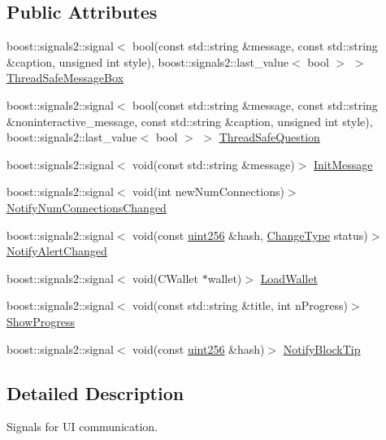 \subsection*{Public Attributes}
\begin{DoxyCompactItemize}
\item 
boost\+::signals2\+::signal$<$ bool(const std\+::string \&message, const std\+::string \&caption, unsigned int style), boost\+::signals2\+::last\+\_\+value$<$ bool $>$ $>$ \mbox{\hyperlink{class_c_client_u_i_interface_a9d328cc06777490e90e8c6a9cb31335f}{Thread\+Safe\+Message\+Box}}
\item 
boost\+::signals2\+::signal$<$ bool(const std\+::string \&message, const std\+::string \&noninteractive\+\_\+message, const std\+::string \&caption, unsigned int style), boost\+::signals2\+::last\+\_\+value$<$ bool $>$ $>$ \mbox{\hyperlink{class_c_client_u_i_interface_aa4db099ecd0f43e4524b9be0ec922b61}{Thread\+Safe\+Question}}
\item 
boost\+::signals2\+::signal$<$ void(const std\+::string \&message)$>$ \mbox{\hyperlink{class_c_client_u_i_interface_abc63cc3f3e5e15632f713d859dbc6bc2}{Init\+Message}}
\item 
boost\+::signals2\+::signal$<$ void(int new\+Num\+Connections)$>$ \mbox{\hyperlink{class_c_client_u_i_interface_a496995d44db8dc3e3ef84d345e25967d}{Notify\+Num\+Connections\+Changed}}
\item 
boost\+::signals2\+::signal$<$ void(const \mbox{\hyperlink{classuint256}{uint256}} \&hash, \mbox{\hyperlink{ui__interface_8h_a293ba931937e469a6327b8d6b4872969}{Change\+Type}} status)$>$ \mbox{\hyperlink{class_c_client_u_i_interface_a2c42ebdda06512513445cd86881b157a}{Notify\+Alert\+Changed}}
\item 
boost\+::signals2\+::signal$<$ void(C\+Wallet $\ast$wallet)$>$ \mbox{\hyperlink{class_c_client_u_i_interface_a32a8930a5b69dd92e25fa474bd6e5420}{Load\+Wallet}}
\item 
boost\+::signals2\+::signal$<$ void(const std\+::string \&title, int n\+Progress)$>$ \mbox{\hyperlink{class_c_client_u_i_interface_a64e516e507dd74f3639c51dffa645af2}{Show\+Progress}}
\item 
boost\+::signals2\+::signal$<$ void(const \mbox{\hyperlink{classuint256}{uint256}} \&hash)$>$ \mbox{\hyperlink{class_c_client_u_i_interface_a4bfd5841b9471733b40568ca21eaf010}{Notify\+Block\+Tip}}
\end{DoxyCompactItemize}


\subsection{Detailed Description}
Signals for UI communication. 

